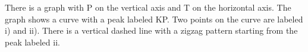 There is a graph with P on the vertical axis and T on the horizontal axis. The graph shows a curve with a peak labeled KP. Two points on the curve are labeled i) and ii). There is a vertical dashed line with a zigzag pattern starting from the peak labeled ii.